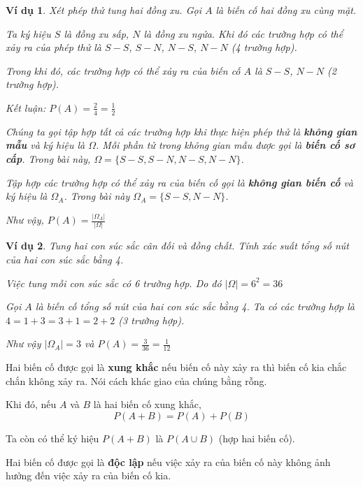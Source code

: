 \documentclass{mynotes}
\newtheorem{example}{Ví dụ}
\begin{document}
\begin{example}
    Xét phép thử tung hai đồng xu. Gọi $A$ là biến cố hai đồng xu cùng mặt.
    
    Ta ký hiệu $S$ là đồng xu sấp, $N$ là đồng xu ngửa. Khi đó các trường hợp có thể xảy ra của phép thử là $S-S$, $S-N$, $N-S$, $N-N$ (4 trường hợp). 
    
    Trong khi đó, các trường hợp có thể xảy ra của biến cố $A$ là $S-S$, $N-N$ (2 trường hợp).
    
    Kết luận: $P(A) = \frac{2}{4} = \frac{1}{2}$
    
    Chúng ta gọi tập hợp tất cả các trường hợp khi thực hiện phép thử là \textbf{không gian mẫu} và ký hiệu là $\Omega$. Mỗi phần tử trong không gian mẫu được gọi là \textbf{biến cố sơ cấp}. Trong bài này, $\Omega = \{S-S, S-N, N-S, N-N\}$.
    
    Tập hợp các trường hợp có thể xảy ra của biến cố gọi là \textbf{không gian biến cố} và ký hiệu là $\Omega_A$. Trong bài này $\Omega_A = \{S-S, N-N\}$.
    
    Như vậy, $P(A) = \frac{|\Omega_A|}{|\Omega|}$
\end{example}

\begin{example}
    Tung hai con súc sắc cân đối và đồng chất. Tính xác suất tổng số nút của hai con súc sắc bằng 4.
    
    Việc tung mỗi con súc sắc có 6 trường hợp. Do đó $|\Omega| = 6^2 = 36$
    
    Gọi $A$ là biến cố tổng số nút của hai con súc sắc bằng 4. Ta có các trường hợp là $4=1+3=3+1=2+2$ (3 trường hợp).
    
    Như vậy $|\Omega_A| = 3$ và $P(A) = \frac{3}{36} = \frac{1}{12}$
\end{example}

\begin{definition}
    Hai biến cố được gọi là \textbf{xung khắc} nếu biến cố này xảy ra thì biến cố kia chắc chắn không xảy ra. Nói cách khác giao của chúng bằng rỗng.
\end{definition}
    
Khi đó, nếu $A$ và $B$ là hai biến cố xung khắc, \[P(A + B) = P(A) + P(B)\]
    
Ta còn có thể ký hiệu $P(A+B)$ là $P(A \cup B)$ (hợp hai biến cố).
    
\begin{definition}
    Hai biến cố được gọi là \textbf{độc lập} nếu việc xảy ra của biến cố này không ảnh hưởng đến việc xảy ra của biến cố kia. 
\end{definition}
\end{document}
